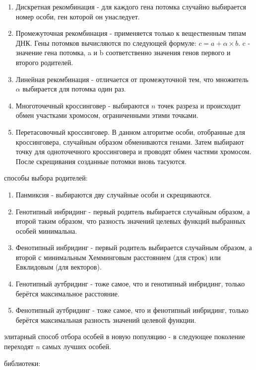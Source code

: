 \documentclass[a4paper, oneside, 11pt]{article}
\begin{document}
\begin{enumerate}
\item Дискретная рекомбинация - для каждого гена потомка случайно выбирается номер особи, ген которой он унаследует.
\item Промежуточная рекомбинация - применяется только к вещественным типам ДНК. Гены потомков вычисляются по следующей формуле: $c = a + \alpha \times b$. c - значение гена потомка, a и b соответственно значения генов первого и второго родителей.
\item Линейная рекомбинация - отличается от промежуточной тем, что множитель $\alpha$ выбирается для потомка один раз.
\item Многоточечный кроссинговер - выбираются $n$ точек разреза и происходит обмен участками хромосом, ограниченными этими точками.
\item Перетасовочный кроссинговер. В данном алгоритме особи, отобранные для кроссинговера, случайным образом обмениваются генами. Затем выбирают точку для одноточечного кроссинговера и проводят обмен частями хромосом. После скрещивания созданные потомки вновь тасуются.
\end{enumerate}
 способы выбора родителей:
\begin{enumerate}
\item Панмиксия - выбираются дву случайные особи и скрещиваются.
\item Генотипный инбридинг - первый родитель выбирается случайным образом, а второй таким образом, что разность значений целевых функций выбранных особей минимальна.
\item Фенотипный инбридинг - первый родитель выбирается случайным образом, а второй с минимальным Хемминговым расстоянием (для строк) или Евклидовым (для векторов).
\item Генотипный аутбридинг - тоже самое, что и генотипный инбридинг, только берётся максимальное расстояние.
\item Фенотипный аутбридинг - тоже самое, что и фенотипный инбридинг, только берётся максимальная разность значений целевой функции.
\end{enumerate}
 элитарный способ отбора особей в новую популяцию - в следующее поколение переходят $n$ самых лучших особей.

 библиотеки:\\
\end{document}
